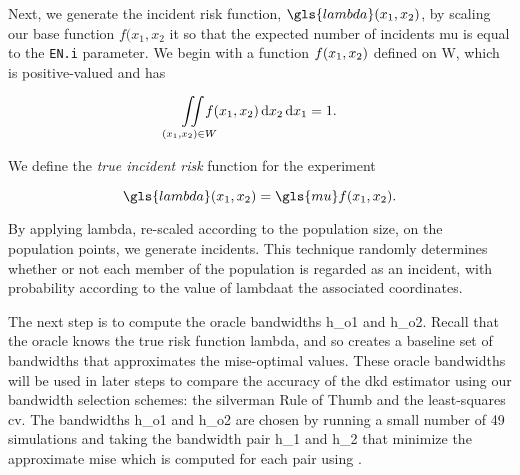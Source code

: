 Next, we generate the incident risk function, $\gls{lambda}\xvec$, by scaling our base function $f(x_1, x_2$ it so that the expected number of incidents \gls{mu} is equal to the \texttt{EN.i} parameter.
We begin with a function $f(x_1, x_2)$ defined on \gls{W}, which is positive-valued and has 

\begin{equation*}
    \iintW{f\xvec} = 1 \text{.}
\end{equation*}

We define the \textit{true incident risk} function for the experiment

\begin{equation}
    \gls{lambda}\xvec = \gls{mu} f\xvec \text{.}
\end{equation}

By applying \gls{lambda}, re-scaled  according to the population size,
on the population points, we generate incidents.
This technique randomly determines whether or not each member of the population is regarded as an incident, with probability according to the value of \gls{lambda}\xvec at the associated coordinates.

The next step is to compute the \glspl{oracle bandwidth} \gls{h_o1} and \gls{h_o2}.
Recall that the \gls{oracle} knows the true risk function \gls{lambda},
and so creates a baseline set of bandwidths that approximates the \gls{mise}-optimal values.
These \glspl{oracle bandwidth} will be used in later steps to compare the accuracy of the \gls{dkd} estimator using our bandwidth selection schemes: the \Gls{silverman} Rule of Thumb and the least-squares \gls{cv}.
The bandwidths \gls{h_o1} and \gls{h_o2} are chosen by running a small number of 49 simulations and taking the bandwidth pair \gls{h_1} and \gls{h_2} that minimize the approximate \gls{mise} which is computed for each pair using .

